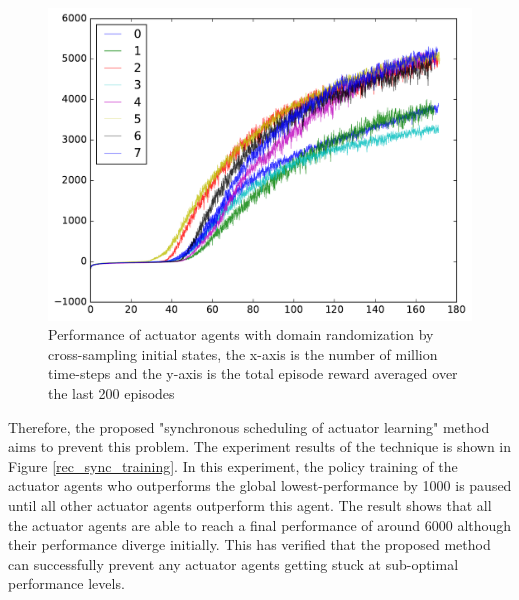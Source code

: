 \begin{figure}[!htbp]
	\includegraphics[width=\textwidth]{images/rec_8task_training.pdf}
	\centering
	\caption{Performance of actuator agents with domain randomization by cross-sampling initial states, the x-axis is the number of million time-steps and the y-axis is the total episode reward averaged over the last 200 episodes}\label{rec_8task_training}
\end{figure}

Therefore, the proposed "synchronous scheduling of actuator learning" method aims to prevent this problem. The experiment results of the technique is shown in Figure \ref{rec_sync_training}. In this experiment, the policy training of the actuator agents who outperforms the global lowest-performance by 1000 is paused until all other actuator agents outperform this agent. The result shows that all the actuator agents are able to reach a final performance of around 6000 although their performance diverge initially. This has verified that the proposed method can successfully prevent any actuator agents getting stuck at sub-optimal performance levels. 


